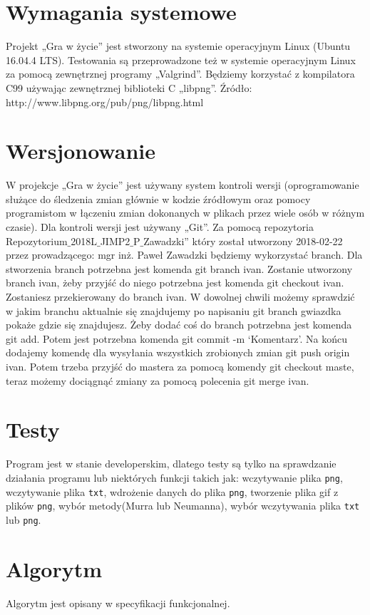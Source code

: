 \documentclass[a4paper, 12pt]{article}
\begin{document}
	\section{Wymagania systemowe}
		\hspace*{1cm} Projekt „Gra w życie” jest stworzony na systemie operacyjnym Linux (Ubuntu 16.04.4 LTS).
Testowania są przeprowadzone też w systemie operacyjnym Linux za pomocą zewnętrznej programy
„Valgrind”.
Będziemy korzystać z kompilatora C99 używając zewnętrznej biblioteki C „libpng”.\newline
Źródło: http://www.libpng.org/pub/png/libpng.html

	\section{Wersjonowanie}
		\hspace*{1cm} W projekcje „Gra w życie” jest używany system kontroli wersji  (oprogramowanie służące do śledzenia zmian głównie w kodzie źródłowym oraz pomocy programistom w łączeniu zmian dokonanych w plikach przez wiele osób w różnym czasie). Dla kontroli wersji jest używany „Git”. Za pomocą repozytoria Repozytorium$\_$2018L$\_$JIMP2$\_$P$\_$Zawadzki” który został utworzony 2018-02-22 przez prowadzącego: mgr inż. Paweł Zawadzki będziemy wykorzystać branch.\newline
		\hspace*{1cm} Dla stworzenia branch potrzebna jest komenda git branch ivan. Zostanie utworzony branch ivan,
żeby przyjść do niego potrzebna jest komenda git checkout ivan. Zostaniesz przekierowany do branch
ivan. W dowolnej chwili możemy sprawdzić w jakim branchu aktualnie się znajdujemy po napisaniu git
branch gwiazdka pokaże gdzie się znajdujesz. Żeby dodać coś do branch potrzebna jest komenda git
add. Potem jest potrzebna komenda git commit -m ‘Komentarz’. Na końcu dodajemy komendę dla
wysyłania wszystkich zrobionych zmian git push origin ivan. Potem trzeba przyjść do mastera za
pomocą komendy git checkout maste, teraz możemy dociągnąć zmiany za pomocą polecenia git merge
ivan.

	\section{Testy}
		\hspace*{1cm} Program jest w stanie developerskim, dlatego testy są tylko na sprawdzanie działania programu lub niektórych funkcji takich jak: wczytywanie plika \texttt{png}, wczytywanie plika \texttt{txt}, wdrożenie danych do plika \texttt{png}, tworzenie plika gif z plików \texttt{png}, wybór metody(Murra lub Neumanna), wybór wczytywania plika \texttt{txt} lub \texttt{png}.

	\section{Algorytm}
		\hspace*{1cm} Algorytm jest opisany w specyfikacji funkcjonalnej.
\label{LastPage}~
\label{LastPageOfBackMatter}~		
\end{document}

